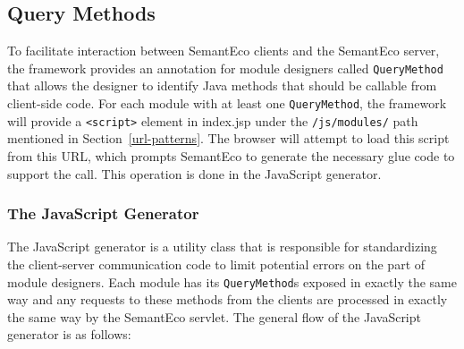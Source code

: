 \documentclass[letterpaper]{report}
\begin{document}
\subsection{Query Methods}
To facilitate interaction between SemantEco clients and the SemantEco server, the framework provides an annotation for module designers called \texttt{QueryMethod} that allows the designer to identify Java methods that should be callable from client-side code. For each module with at least one \texttt{QueryMethod}, the framework will provide a \texttt{<script>} element in index.jsp under the \texttt{/js/modules/} path mentioned in Section~\ref{url-patterns}. The browser will attempt to load this script from this URL, which prompts SemantEco to generate the necessary glue code to support the call. This operation is done in the JavaScript generator.

\subsubsection{The JavaScript Generator}
The JavaScript generator is a utility class that is responsible for standardizing the client-server communication code to limit potential errors on the part of module designers. Each module has its \texttt{QueryMethod}s exposed in exactly the same way and any requests to these methods from the clients are processed in exactly the same way by the SemantEco servlet. The general flow of the JavaScript generator is as follows:
\end{document}
